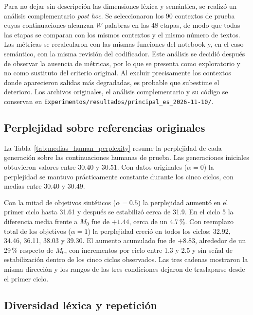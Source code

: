 \documentclass[12pt,letterpaper]{article}
\begin{document}
Para no dejar sin descripción las dimensiones léxica y semántica, se realizó
un análisis complementario \textit{post hoc}. Se seleccionaron los 90
contextos de prueba cuyas continuaciones alcanzan \(W\) palabras en las 48
etapas, de modo que todas las etapas se comparan con los mismos contextos y
el mismo número de textos. Las métricas se recalcularon con las mismas
funciones del notebook y, en el caso semántico, con la misma revisión del
codificador. Este análisis se decidió después de observar la ausencia de
métricas, por lo que se presenta como exploratorio y no como sustituto del
criterio original. Al excluir precisamente los contextos donde aparecieron
salidas más degradadas, es probable que subestime el deterioro.
Los archivos originales, el análisis complementario y su código se conservan
en \texttt{Experimentos/resultados/principal\_es\_2026-11-10/}.

\subsection{Perplejidad sobre referencias originales}

La Tabla~\ref{tab:medias_human_perplexity} resume la perplejidad de cada
generación sobre las continuaciones humanas de prueba. Las generaciones
iniciales obtuvieron valores entre 30.40 y 30.51. Con datos originales
(\(\alpha=0\)) la perplejidad se mantuvo prácticamente constante durante
los cinco ciclos, con medias entre 30.40 y 30.49.



Con la mitad de objetivos sintéticos (\(\alpha=0.5\)) la perplejidad
aumentó en el primer ciclo hasta 31.61 y después se estabilizó cerca de 31.9.
En el ciclo 5 la diferencia media frente a \(M_0\) fue de \(+1.44\), cerca de
un 4.7\,\%. Con reemplazo total de los objetivos (\(\alpha=1\)) la
perplejidad creció en todos los ciclos: 32.92, 34.46, 36.11, 38.03 y 39.30.
El aumento acumulado fue de \(+8.83\), alrededor de un 29\,\% respecto de
\(M_0\), con incrementos por ciclo entre 1.3 y 2.5 y sin señal de
estabilización dentro de los cinco ciclos observados. Las tres cadenas
mostraron la misma dirección y los rangos de las tres condiciones dejaron
de traslaparse desde el primer ciclo.

\subsection{Diversidad léxica y repetición}
\end{document}
